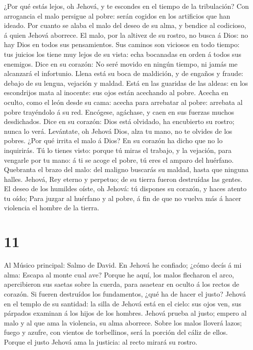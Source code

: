  ¿Por qué estás lejos, oh Jehová, y te escondes en el
tiempo de la tribulación?  Con arrogancia el malo persigue
al pobre: serán cogidos en los artificios que han ideado. 
Por cuanto se alaba el malo del deseo de su alma, y bendice al
codicioso, á quien Jehová aborrece.  El malo, por la
altivez de su rostro, no busca á Dios: no hay Dios en todos sus
pensamientos.  Sus caminos son viciosos en todo tiempo:
tus juicios los tiene muy lejos de su vista: echa bocanadas en orden á
todos sus enemigos.  Dice en su corazón: No seré movido en
ningún tiempo, ni jamás me alcanzará el infortunio.  Llena
está su boca de maldición, y de engaños y fraude: debajo de su lengua,
vejación y maldad.  Está en las guaridas de las aldeas: en
los escondrijos mata al inocente: sus ojos están acechando al pobre.
 Acecha en oculto, como el león desde su cama: acecha para
arrebatar al pobre: arrebata al pobre trayéndolo á su red.
 Encógese, agáchase, y caen en sus fuerzas muchos
desdichados.  Dice en su corazón: Dios está olvidado, ha
encubierto su rostro; nunca lo verá.  Levántate, oh
Jehová Dios, alza tu mano, no te olvides de los pobres. 
¿Por qué irrita el malo á Dios? En su corazón ha dicho que no lo
inquirirás.  Tú lo tienes visto: porque tú miras el
trabajo, y la vejación, para vengarle por tu mano: á ti se acoge el
pobre, tú eres el amparo del huérfano.  Quebranta el
brazo del malo: del maligno buscarás su maldad, hasta que ninguna
halles.  Jehová, Rey eterno y perpetuo; de su tierra
fueron destruídas las gentes.  El deseo de los humildes
oíste, oh Jehová: tú dispones su corazón, y haces atento tu oído;
 Para juzgar al huérfano y al pobre, á fin de que no
vuelva más á hacer violencia el hombre de la tierra.

\hypertarget{section-10}{%
\section{11}\label{section-10}}

 Al Músico principal: Salmo de David. En Jehová he
confiado; ¿cómo decís á mi alma: Escapa al monte cual ave?
 Porque he aquí, los malos flecharon el arco, apercibieron
sus saetas sobre la cuerda, para asaetear en oculto á los rectos de
corazón.  Si fueren destruídos los fundamentos, ¿qué ha de
hacer el justo?  Jehová en el templo de su santidad: la
silla de Jehová está en el cielo: sus ojos ven, sus párpados examinan á
los hijos de los hombres.  Jehová prueba al justo; empero
al malo y al que ama la violencia, su alma aborrece. 
Sobre los malos lloverá lazos; fuego y azufre, con vientos de
torbellinos, será la porción del cáliz de ellos.  Porque
el justo Jehová ama la justicia: al recto mirará su rostro.


